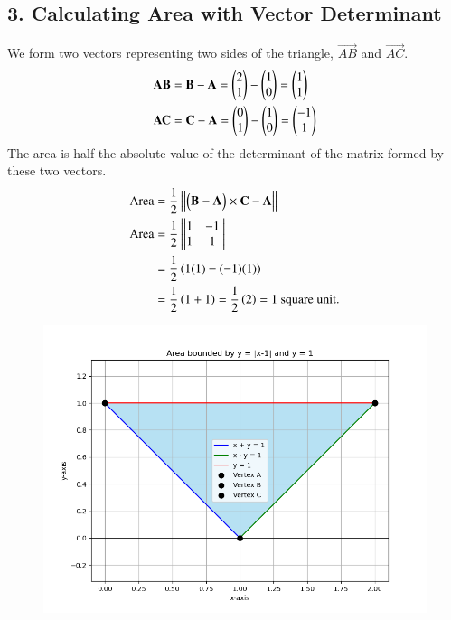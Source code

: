 \documentclass[journal]{IEEEtran}
\begin{document}
\subsection*{3. Calculating Area with Vector Determinant}
We form two vectors representing two sides of the triangle, $\vec{AB}$ and $\vec{AC}$.
\begin{align}  
\mathbf{AB} &= \mathbf{B} - \mathbf{A} = \begin{pmatrix}2 \\ 1\end{pmatrix} - \begin{pmatrix}1 \\ 0\end{pmatrix} = \begin{pmatrix}1 \\ 1\end{pmatrix} \\
\mathbf{AC} &= \mathbf{C} - \mathbf{A} = \begin{pmatrix}0 \\ 1\end{pmatrix} - \begin{pmatrix}1 \\ 0\end{pmatrix} = \begin{pmatrix}-1 \\ 1\end{pmatrix}
\end{align}  
The area is half the absolute value of the determinant of the matrix formed by these two vectors.
\begin{align}  
\text{Area} &=\frac{1}{2}\left\vert\begin{vmatrix}\begin{pmatrix}{\mathbf{B}-\mathbf{A}}\end{pmatrix}\times{\mathbf{C}-\mathbf{A}}\end{vmatrix}\right\vert \\
\text{Area} &= \frac{1}{2} \left\vert\begin{vmatrix}1 & -1 \\ 1 & 1\end{vmatrix}\right\vert \\
&= \frac{1}{2} \left(1(1) - (-1)(1)\right) \\
&= \frac{1}{2} \left(1 + 1\right) = \frac{1}{2} \left(2\right) = 1 \text{ square unit.}
\end{align}  
\newpage
 \begin{figure}
    \centering
    \includegraphics[width=0.9\columnwidth]{figs/Figure_1.png}
    \label{fig:placeholder}
    \caption{}
\end{figure}
\end{document}
